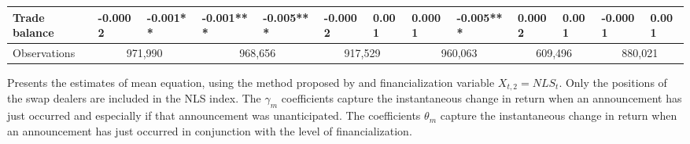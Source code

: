 \begin{landscape}
\begin{table}[]
{\begin{tabular}{lllllllllllll}
Trade balance            & -0.0002   & -0.001**  & -0.001***  & -0.005*** & -0.0002    & 0.001    & 0.0001     & -0.005*** & 0.0002     & 0.001     & -0.0001  & 0.001     \\ \hline
Observations &
  \multicolumn{2}{c}{971,990} &
  \multicolumn{2}{c}{968,656} &
  \multicolumn{2}{c}{917,529} &
  \multicolumn{2}{c}{960,063} &
  \multicolumn{2}{c}{609,496} &
  \multicolumn{2}{c}{880,021} \\ \hline
\end{tabular}%
}
  \singlespacing
        \footnotesize
      Presents the estimates of mean equation, using the method proposed by \citep{kurov2019price} and financialization variable $X_{t,2}=NLS_t$. Only the positions of the swap dealers are included in the NLS index. The $\gamma_m$ coefficients capture the instantaneous change in return when an announcement has just occurred and especially if that announcement was unanticipated. The coefficients $\theta_m$ capture the instantaneous change in return when an announcement has just occurred in conjunction with the level of financialization.
\end{table}
\end{landscape}

